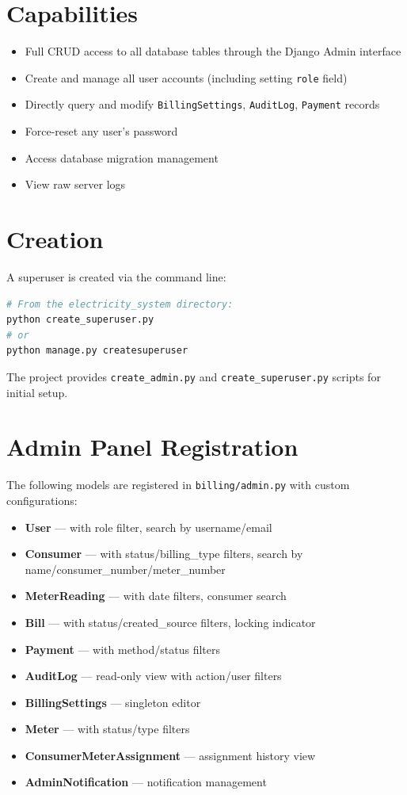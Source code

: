 \documentclass[12pt, a4paper]{report}
\newenvironment{featurelist}{%
    \begin{itemize}[leftmargin=1.5em, itemsep=2pt, parsep=0pt]
}{%
    \end{itemize}
}
\begin{document}
\section{Capabilities}

\begin{featurelist}
    \item Full CRUD access to all database tables through the Django Admin interface
    \item Create and manage all user accounts (including setting \texttt{role} field)
    \item Directly query and modify \texttt{BillingSettings}, \texttt{AuditLog}, \texttt{Payment} records
    \item Force-reset any user's password
    \item Access database migration management
    \item View raw server logs
\end{featurelist}

\section{Creation}

A superuser is created via the command line:
\begin{lstlisting}[language=bash]
# From the electricity_system directory:
python create_superuser.py
# or
python manage.py createsuperuser
\end{lstlisting}

The project provides \texttt{create\_admin.py} and \texttt{create\_superuser.py} scripts for initial setup.

\section{Admin Panel Registration}

The following models are registered in \texttt{billing/admin.py} with custom configurations:
\begin{featurelist}
    \item \textbf{User} — with role filter, search by username/email
    \item \textbf{Consumer} — with status/billing\_type filters, search by name/consumer\_number/meter\_number
    \item \textbf{MeterReading} — with date filters, consumer search
    \item \textbf{Bill} — with status/created\_source filters, locking indicator
    \item \textbf{Payment} — with method/status filters
    \item \textbf{AuditLog} — read-only view with action/user filters
    \item \textbf{BillingSettings} — singleton editor
    \item \textbf{Meter} — with status/type filters
    \item \textbf{ConsumerMeterAssignment} — assignment history view
    \item \textbf{AdminNotification} — notification management
\end{featurelist}
\end{document}
